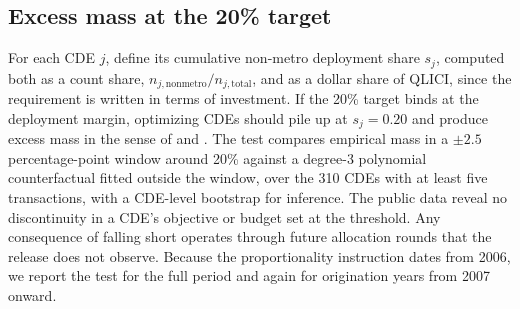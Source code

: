 \subsection{Excess mass at the 20\% target}

For each CDE $j$, define its cumulative non-metro deployment share $s_j$,
computed both as a count share, $n_{j,\mathrm{nonmetro}}/n_{j,\mathrm{total}}$,
and as a dollar share of QLICI, since the requirement is written in terms of
investment. If the 20\% target binds at the deployment margin, optimizing
CDEs should pile up at $s_j = 0.20$ and produce excess mass in the sense of
\citet{chetty2011} and \citet{kleven2016}. The test compares empirical mass
in a $\pm 2.5$ percentage-point window around 20\% against a degree-3
polynomial counterfactual fitted outside the window, over the 310 CDEs with
at least five transactions, with a CDE-level bootstrap for inference. The
public data reveal no discontinuity in a CDE's objective or budget set at
the threshold. Any consequence of falling short operates through future
allocation rounds that the release does not observe. Because the
proportionality instruction dates from 2006, we report the test for the full
period and again for origination years from 2007 onward.
